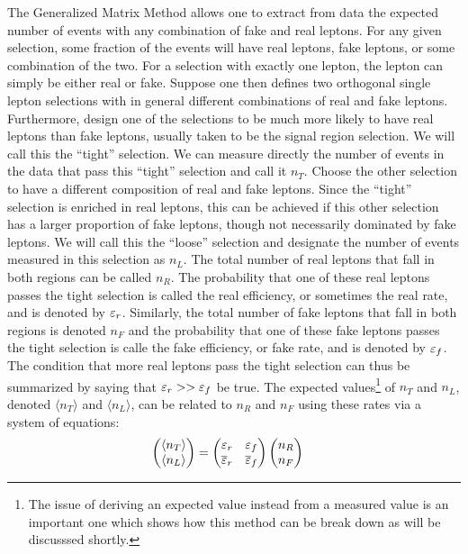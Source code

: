 The Generalized Matrix Method allows one to extract from data the expected
number of events with any combination of fake and real leptons.
For any given selection, some fraction of the events will have 
real leptons, fake leptons, or some combination of the two.
For a selection with exactly one lepton, the lepton 
can simply be either real or fake.  Suppose one then defines
two orthogonal single lepton
selections with in general different combinations of real and fake leptons.
Furthermore, design one of the selections to be much more likely to have
real leptons than fake leptons, usually taken 
to be the signal region selection. We will call this the ``tight'' selection.
We can measure directly the number of events in the data that
pass this ``tight'' selection and call it $n_T$. Choose the other selection
to have a different composition of real and fake leptons. Since the 
``tight'' selection is enriched in real leptons, this can be achieved
if this other selection has a larger proportion of fake leptons, though
not necessarily dominated by fake leptons. We will call this the
``loose'' selection and designate the number of events measured
in this selection as $n_L$. The total number of real leptons that fall in 
both regions can be called $n_R$. The probability that one of these
real leptons passes the tight selection is called the 
real efficiency, or sometimes the real rate, and is denoted by 
$\varepsilon_r$. Similarly, the total number of fake leptons 
that fall in both regions is denoted $n_F$ and the probability 
that one of these fake leptons passes the tight selection is 
calle the fake efficiency, or fake rate, and is 
denoted by $\varepsilon_f$. The condition that
more real leptons pass the tight selection can thus be summarized by saying
that $\varepsilon_r>>\varepsilon_f$ be true.
The expected values\footnote{The issue
of deriving an expected value instead from a measured value
is an important one which shows how this method can be break down 
as will be discusssed shortly.} of  $n_T$ and $n_L$,
denoted $\langle n_T\rangle$ and $\langle n_L\rangle$,
can be related to $n_R$ and $n_F$ using these rates via a system of
equations:
\begin{align}
  \label{eq:mxm_single}
  \begin{pmatrix} \langle n_T\rangle \\ \langle n_L\rangle \end{pmatrix} 
  &= 
  \begin{pmatrix}
  \varepsilon_r & \varepsilon_f \\ \overline{\varepsilon}_r & \overline{\varepsilon}_f
  \end{pmatrix} 
  \begin{pmatrix} n_R \\ n_F \end{pmatrix}
\end{align}
